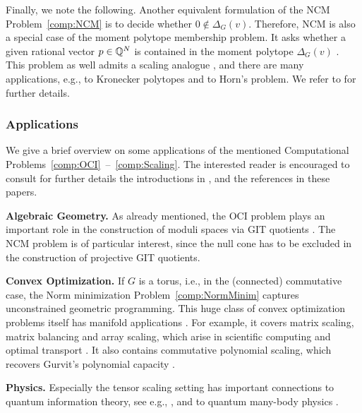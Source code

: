 Finally, we note the following. Another equivalent formulation of the NCM Problem~\ref{comp:NCM} is to decide whether $0 \notin \Delta_{G}(v)$. Therefore, NCM is also a special case of the moment polytope membership problem. It asks whether a given rational vector $p \in \mathbb Q^N$ is contained in the moment polytope $\Delta_G(v)$ \cite[Problem~1.11]{GradflowArXiv}. This problem as well admits a scaling analogue \cite[Problems~1.12]{GradflowArXiv}, and there are many applications, e.g., to Kronecker polytopes and to Horn's problem. We refer to \cite{burgisser2018efficient, GradflowArXiv} for further details.




\subsubsection*{Applications}

We give a brief overview on some applications of the mentioned Computational Problems~\ref{comp:OCI}~--~\ref{comp:Scaling}. The interested reader is encouraged to consult for further details the introductions in \cite{burgisser2017alternating, burgisser2018efficient, GradflowArXiv}, \cite[Section~5]{gargOliveira2018Survey} and the references in these papers.

\textbf{Algebraic Geometry.}
As already mentioned, the OCI problem plays an important role in the
construction of moduli spaces via GIT quotients \cite{MumfordGITbook, NewsteadBook, hoskinsLectureModuli}. The NCM problem is of particular interest, since the null cone has to be excluded in the construction of projective GIT quotients.

\textbf{Convex Optimization.}
If $G$ is a torus, i.e., in the (connected) commutative case, the Norm minimization Problem~\ref{comp:NormMinim} captures unconstrained geometric programming. This huge class of convex optimization problems itself has manifold applications \cite{duffin1967geometric, peterson1976geometric, ecker1980geometric, boyd2007tutorial}. For example, it covers matrix scaling, matrix balancing and array scaling, which arise in scientific computing and optimal transport \cite{cuturi2013sinkhorn, parlett1971balancing}. It also contains commutative polynomial scaling, which recovers Gurvit's polynomial capacity \cite{gurvits2004combinatorial, gurvits2006hyperbolic}.

\textbf{Physics.}
Especially the tensor scaling setting has important connections to quantum information theory, see e.g., \cite{klyachko2006quantum, sawicki2014convexity, walterPhDthesis, burgisser2018efficient}, and to quantum many-body physics \cite{haroldEtAl2022minimal}.

